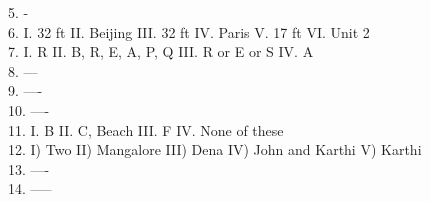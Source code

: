 \documentclass[
]{article}
\begin{document}
5. -\\

6. I. 32 ft \hspace{2mm}II. Beijing \hspace{2mm}III. 32 ft \hspace{2mm}IV. Paris \hspace{2mm}V. 17 ft \hspace{2mm}VI. Unit 2\\

7. I. R \hspace{2mm}II. B, R, E, A, P, Q \hspace{2mm}III. R or E or S \hspace{2mm}IV. A\\

8. ---\\

9. ----\\

10. ----\\

11. I. B \hspace{2mm}II. C, Beach \hspace{2mm}III. F \hspace{2mm}IV. None of these\\

12. I) Two \hspace{2mm}II) Mangalore \hspace{2mm}III) Dena \hspace{2mm}IV) John and Karthi \hspace{2mm}V) Karthi\\

13. ----\\

14. -----\\
\end{document}
